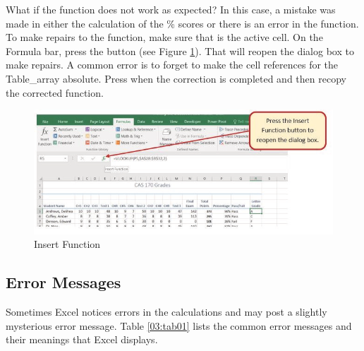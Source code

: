 What if the  function does not work as expected? In this case, a mistake was made in either the calculation of the \% scores or there is an error in the  function. To make repairs to the function, make sure that  is the active cell. On the Formula bar, press the  button (see Figure \ref{03:fig15}). That will reopen the dialog box to make repairs. A common error is to forget to make the cell references for the Table\_array absolute. Press  when the correction is completed and then recopy the corrected function.

\begin{figure}[H]
	\centering
	\includegraphics[width=\maxwidth{.95\linewidth}]{gfx/ch03_fig15}
	\caption{Insert Function}
	\label{03:fig15}
\end{figure}

\subsection{Error Messages}

Sometimes Excel notices errors in the calculations and may post a slightly mysterious error message. Table \ref{03:tab01} lists the common error messages and their meanings that Excel displays.

